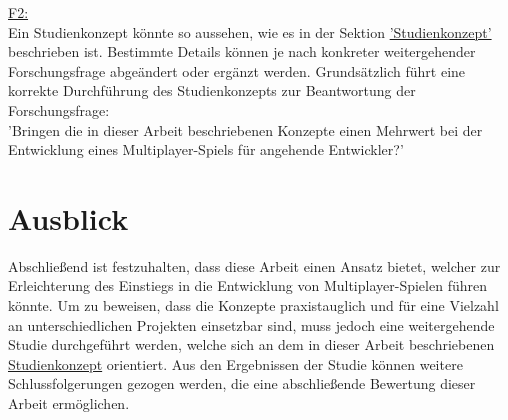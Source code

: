\hyperref[f2]{F2:} \\
Ein Studienkonzept könnte so aussehen, wie es in der Sektion \hyperref[studienkonzept]{'Studienkonzept'} beschrieben ist. Bestimmte Details können je nach konkreter weitergehender Forschungsfrage abgeändert oder ergänzt werden. Grundsätzlich führt eine korrekte Durchführung des Studienkonzepts zur Beantwortung der Forschungsfrage: \\
'Bringen die in dieser Arbeit beschriebenen Konzepte einen Mehrwert bei der Entwicklung eines Multiplayer-Spiels für angehende Entwickler?'

\section{Ausblick}

Abschließend ist festzuhalten, dass diese Arbeit einen Ansatz bietet, welcher zur Erleichterung des Einstiegs in die Entwicklung von Multiplayer-Spielen führen könnte. Um zu beweisen, dass die Konzepte praxistauglich und für eine Vielzahl an unterschiedlichen Projekten einsetzbar sind, muss jedoch eine weitergehende Studie durchgeführt werden, welche sich an dem in dieser Arbeit beschriebenen \hyperref[studienkonzept]{Studienkonzept} orientiert. Aus den Ergebnissen der Studie können weitere Schlussfolgerungen gezogen werden, die eine abschließende Bewertung dieser Arbeit ermöglichen.